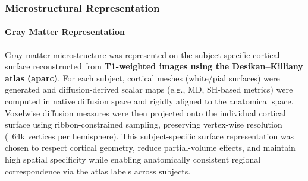 \subsubsection{Microstructural Representation}

\paragraph{Gray Matter Representation}
Gray matter microstructure was represented on the subject-specific cortical surface reconstructed from 
\textbf{T1-weighted images using the Desikan–Killiany atlas (aparc)}. For each subject, cortical meshes 
(white/pial surfaces) were generated and diffusion-derived scalar maps (e.g., MD, SH-based metrics) 
were computed in native diffusion space and rigidly aligned to the anatomical space. Voxelwise 
diffusion measures were then projected onto the individual cortical surface using ribbon-constrained 
sampling, preserving vertex-wise resolution (~64k vertices per hemisphere). This subject-specific 
surface representation was chosen to respect cortical geometry, reduce partial-volume effects, and 
maintain high spatial specificity while enabling anatomically consistent regional correspondence via 
the atlas labels across subjects.

